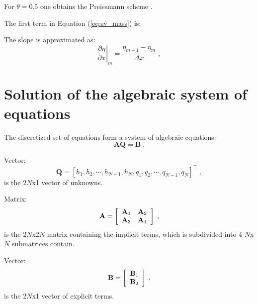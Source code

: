 \documentclass{deltares_manual}
\begin{document}
For $\theta=0.5$ one obtains the Preissmann scheme \citep{Preissmann61_2,Preissmann61_3,Lyn87_2}.

The first term in Equation (\ref{eq:sv_mass}) is:
\begin{equation}

\end{equation}

The slope is approximated as:
\begin{equation}
\left.\frac{\partial \eta}{\partial x}\right|_{m}=\frac{\eta_{m+1}-\eta_{m}}{\Delta x} \;,
\end{equation}




\section{Solution of the algebraic system of equations}

The discretized set of equations form a system of algebraic equations:
\begin{equation}
\label{eq:alg}
\mathbf{A}\mathbf{Q}=\mathbf{B}\;.
\end{equation}

Vector:
\begin{equation}
\mathbf{Q}=[h_1, h_2, \cdots, h_{N-1}, h_N, q_1, q_2, \cdots, q_{N-1}, q_N]^{\intercal} \;,
\end{equation}
is the $2N$x1 vector of unknowns. 

Matrix:
\begin{equation}
\makebox[\textwidth][c]{$
		\mathbf{A}=\left[
		\begin{array}{cc}
  \mathbf{A}_{1} & \mathbf{A}_{2} \\
	\mathbf{A}_{3} & \mathbf{A}_{4} \\
 \end{array}\right] \;,
$} 
\end{equation}
is the $2N$x$2N$ matrix containing the implicit terms, which is subdivided into 4 $N$x$N$ submatrices contain.

Vector:
\begin{equation}
\makebox[\textwidth][c]{$
		\mathbf{B}=\left[
		\begin{array}{cc}
  \mathbf{B}_{1}\\
	\mathbf{B}_{2}\\
 \end{array}\right] \;,
$} 
\end{equation}
is the $2N$x1 vector of explicit terms. 
\end{document}
